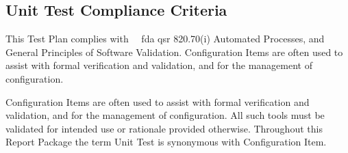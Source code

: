 \subsection{Unit Test Compliance Criteria}
This Test Plan complies with \sopSDLC\, \sopSCM\, \Gls{fda} \Gls{qsr}
820.70(i) Automated Processes, and General Principles of Software Validation.
Configuration Items are often used to assist with formal verification and
validation, and for the management of configuration.

Configuration Items are often used to assist with formal verification and
validation, and for the management of configuration.  All such tools must be
validated for intended use or rationale provided otherwise.  Throughout this
Report Package the term Unit Test is synonymous with Configuration Item.
